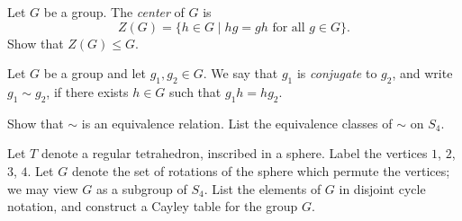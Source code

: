 \documentclass{article}
\begin{document}
\begin{Prob}
Let $G$ be a group.  The {\em center} of $G$ is
\[ Z(G) = \{ h \in G \mid hg = gh \text{ for all } g \in G \} . \]
Show that $Z(G) \le G$.
\end{Prob}

\begin{Prob}
Let $G$ be a group and let $g_1,g_2 \in G$.
We say that $g_1$ is {\em conjugate} to $g_2$, and write $g_1 \sim g_2$,
if there exists $h \in G$ such that $g_1 h = h g_2$.
\begin{itemize}
 Show that $\sim$ is an equivalence relation.
 List the equivalence classes of $\sim$ on $S_4$.
\end{itemize}
\end{Prob}

\begin{Prob}
Let $T$ denote a regular tetrahedron, inscribed in a sphere.
Label the vertices $1$, $2$, $3$, $4$.
Let $G$ denote the set of rotations of the sphere which permute the vertices;
we may view $G$ as a subgroup of $S_4$.  List the elements of $G$ in disjoint
cycle notation, and construct a Cayley table for the group $G$.
\end{Prob}
\end{document}
